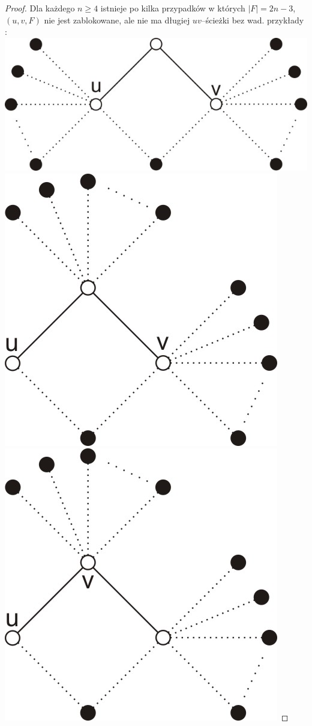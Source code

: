 \documentclass{pracamgr}
\begin{document}
   \begin{proof}
   Dla każdego $n\ge 4$ istnieje po kilka przypadków w których $|F|=2n-3$, $(u,v,F)$ nie jest zablokowane, ale nie ma długiej $uv$--ścieżki bez wad. przykłady :\newline
   \includegraphics{img/Q_niezablokowane_1.jpg}\quad\quad\quad
   \includegraphics{img/Q_niezablokowane_2.jpg}\quad\quad\quad
   \includegraphics{img/Q_niezablokowane_3.jpg}
   \end{proof}
\end{document}
